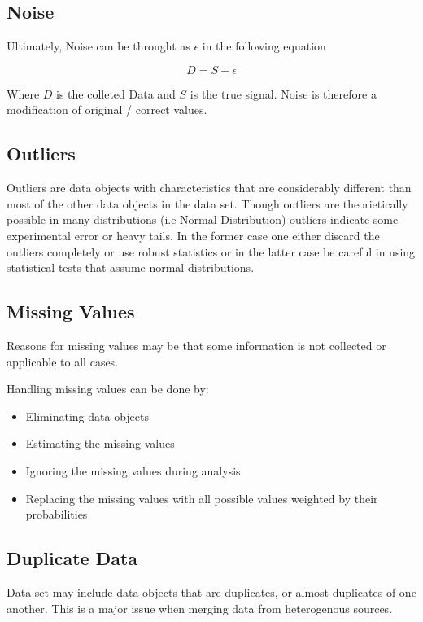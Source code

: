 \subsection{Noise}
Ultimately, Noise can be throught as $\epsilon$ in the following equation

\begin{equation}
    D = S + \epsilon
\end{equation}

Where $D$ is the colleted Data and $S$ is the true signal. Noise is therefore a 
modification of original / correct values.

\subsection{Outliers}
Outliers are data objects with characteristics that are considerably different 
than most of the other data objects in the data set. Though outliers are 
theorietically possible in many distributions (i.e Normal Distribution) outliers
indicate some experimental error or heavy tails. In the former case one either
discard the outliers completely or use robust statistics or in the latter case
be careful in using statistical tests that assume normal distributions.

\subsection{Missing Values}
Reasons for missing values may be that some information is not collected or 
applicable to all cases.

Handling missing values can be done by:

\begin{itemize}
    \item Eliminating data objects
    \item Estimating the missing values
    \item Ignoring the missing values during analysis
    \item Replacing the missing values with all possible values weighted by 
    their probabilities
\end{itemize}

\subsection{Duplicate Data}
Data set may include data objects that are duplicates, or almost duplicates of 
one another. This is a major issue when merging data from heterogenous sources.

